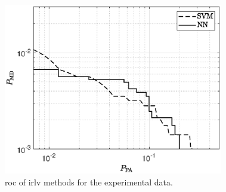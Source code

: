 \documentclass[final,twocolumn]{IEEEtran}
\begin{document}



\begin{figure}[t]
    \centering
    \includegraphics[width=9.6cm]{berlinNew.eps}
    \caption{\ac{roc} of \ac{irlv} methods for the experimental data.}
    \label{fig:Berlinnew}
\end{figure}
\end{document}
